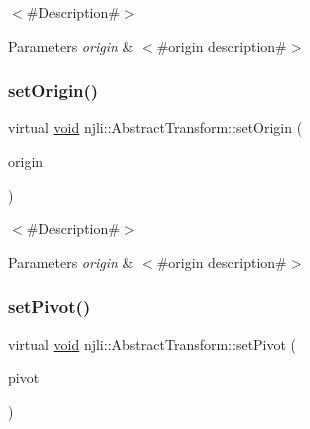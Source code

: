 $<$\#\+Description\#$>$


\begin{DoxyParams}{Parameters}
{\em origin} & $<$\#origin description\#$>$ \\
\hline
\end{DoxyParams}
\mbox{\label{classnjli_1_1_abstract_transform_a82759647e299853f562331879818eaa7}} 
\subsubsection{\texorpdfstring{set\+Origin()}{setOrigin()}\hspace{0.1cm}{\footnotesize\ttfamily [2/2]}}
{\footnotesize\ttfamily virtual \mbox{\hyperlink{_thread_8h_af1e856da2e658414cb2456cb6f7ebc66}{void}} njli\+::\+Abstract\+Transform\+::set\+Origin (\begin{DoxyParamCaption}\item[{const bt\+Vector2 \&}]{origin }\end{DoxyParamCaption})\hspace{0.3cm}{\ttfamily [virtual]}}

$<$\#\+Description\#$>$


\begin{DoxyParams}{Parameters}
{\em origin} & $<$\#origin description\#$>$ \\
\hline
\end{DoxyParams}
\mbox{\label{classnjli_1_1_abstract_transform_aa2adbe5fcda38419fa30b22a59f734b3}} 
\subsubsection{\texorpdfstring{set\+Pivot()}{setPivot()}}
{\footnotesize\ttfamily virtual \mbox{\hyperlink{_thread_8h_af1e856da2e658414cb2456cb6f7ebc66}{void}} njli\+::\+Abstract\+Transform\+::set\+Pivot (\begin{DoxyParamCaption}\item[{const bt\+Transform \&}]{pivot }\end{DoxyParamCaption})\hspace{0.3cm}{\ttfamily [virtual]}}

